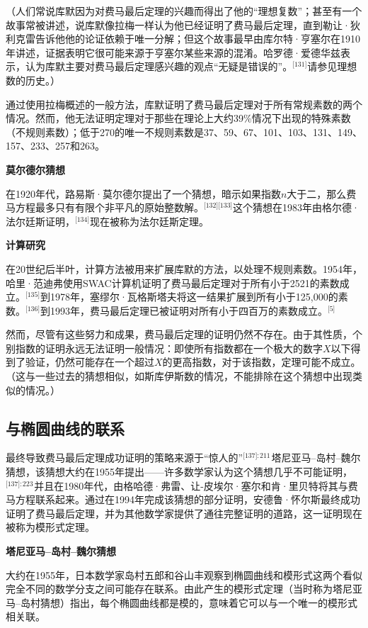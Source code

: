 （人们常说库默因为对费马最后定理的兴趣而得出了他的“理想复数”；甚至有一个故事常被讲述，说库默像拉梅一样认为他已经证明了费马最后定理，直到勒让·狄利克雷告诉他他的论证依赖于唯一分解；但这个故事最早由库尔特·亨塞尔在1910年讲述，证据表明它很可能来源于亨塞尔某些来源的混淆。哈罗德·爱德华兹表示，认为库默主要对费马最后定理感兴趣的观点“无疑是错误的”。\(^\text{[131]}\)请参见理想数的历史。）

通过使用拉梅概述的一般方法，库默证明了费马最后定理对于所有常规素数的两个情况。然而，他无法证明定理对于那些在理论上大约39\%情况下出现的特殊素数（不规则素数）；低于270的唯一不规则素数是37、59、67、101、103、131、149、157、233、257和263。

\textbf{莫尔德尔猜想}

在1920年代，路易斯·莫尔德尔提出了一个猜想，暗示如果指数\( n \)大于二，那么费马方程最多只有有限个非平凡的原始整数解。\(^\text{[132][133]}\)这个猜想在1983年由格尔德·法尔廷斯证明，\(^\text{[134]}\)现在被称为法尔廷斯定理。

\textbf{计算研究}  

在20世纪后半叶，计算方法被用来扩展库默的方法，以处理不规则素数。1954年，哈里·范迪弗使用SWAC计算机证明了费马最后定理对于所有小于2521的素数成立。\(^\text{[135]}\)到1978年，塞缪尔·瓦格斯塔夫将这一结果扩展到所有小于125,000的素数。\(^\text{[136]}\)到1993年，费马最后定理已被证明对所有小于四百万的素数成立。\(^\text{[5]}\)

然而，尽管有这些努力和成果，费马最后定理的证明仍然不存在。由于其性质，个别指数的证明永远无法证明一般情况：即使所有指数都在一个极大的数字\( X \)以下得到了验证，仍然可能存在一个超过\( X \)的更高指数，对于该指数，定理可能不成立。（这与一些过去的猜想相似，如斯库伊斯数的情况，不能排除在这个猜想中出现类似的情况。）
\subsection{与椭圆曲线的联系}  
最终导致费马最后定理成功证明的策略来源于“惊人的”\(^\text{[137]: 211}\) 塔尼亚马–岛村–魏尔猜想，该猜想大约在1955年提出——许多数学家认为这个猜想几乎不可能证明，\(^\text{[137]: 223 }\)并且在1980年代，由格哈德·弗雷、让-皮埃尔·塞尔和肯·里贝特将其与费马方程联系起来。通过在1994年完成该猜想的部分证明，安德鲁·怀尔斯最终成功证明了费马最后定理，并为其他数学家提供了通往完整证明的道路，这一证明现在被称为模形式定理。

\textbf{塔尼亚马–岛村–魏尔猜想 } 

大约在1955年，日本数学家岛村五郎和谷山丰观察到椭圆曲线和模形式这两个看似完全不同的数学分支之间可能存在联系。由此产生的模形式定理（当时称为塔尼亚马–岛村猜想）指出，每个椭圆曲线都是模的，意味着它可以与一个唯一的模形式相关联。

